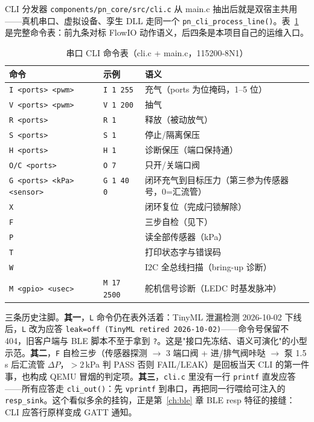CLI 分发器 \texttt{components/pn\_core/src/cli.c} 从 main.c 抽出后就是双宿主共用——真机串口、虚拟设备、孪生 DLL 走同一个 \texttt{pn\_cli\_process\_line()}。表~\ref{tab:fw-cli} 是完整命令表：前九条对标 FlowIO 动作语义，后四条是本项目自己的运维入口。

\begin{table}[htbp]
  \centering
  \caption{串口 CLI 命令表（cli.c + main.c，115200-8N1）}
  \label{tab:fw-cli}
  \begin{tabular}{llp{5.6cm}}
    \toprule
    命令 & 示例 & 语义 \\
    \midrule
    \texttt{I <ports> <pwm>} & \texttt{I 1 255} & 充气（ports 为位掩码，1--5 位） \\
    \texttt{V <ports> <pwm>} & \texttt{V 1 200} & 抽气 \\
    \texttt{R <ports>} & \texttt{R 1} & 释放（被动放气） \\
    \texttt{S <ports>} & \texttt{S 1} & 停止/隔离保压 \\
    \texttt{H <ports>} & \texttt{H 1} & 诊断保压（端口保持通） \\
    \texttt{O/C <ports>} & \texttt{O 7} & 只开/关端口阀 \\
    \texttt{G <ports> <kPa> <sensor>} & \texttt{G 1 40 0} & 闭环充气到目标压力（第三参为传感器号，0=汇流管） \\
    \texttt{X} & & 闭环复位（完成闩锁解除） \\
    \texttt{F} & & 三步自检（见下） \\
    \texttt{P} & & 读全部传感器（kPa） \\
    \texttt{T} & & 打印状态字与错误码 \\
    \texttt{W} & & I2C 全总线扫描（bring-up 诊断） \\
    \texttt{M <gpio> <usec>} & \texttt{M 17 2500} & 舵机信号诊断（LEDC 时基发脉冲） \\
    \bottomrule
  \end{tabular}
\end{table}

三条历史注脚。\textbf{其一}，\texttt{L} 命令仍在表外活着：TinyML 泄漏检测 2026-10-02 下线后，\texttt{L} 改为应答 \texttt{leak=off (TinyML retired 2026-10-02)}——命令号保留不 404，旧客户端与 BLE 脚本不至于拿到 \texttt{?}。这是"接口先冻结、语义可演化"的小型示范。\textbf{其二}，\texttt{F} 自检三步（传感器探测 $\to$ 3 端口阀 + 进/排气阀咔哒 $\to$ 泵 1.5\,s 后汇流管 $\Delta P$，$>2$\,kPa 判 PASS 否则 FAIL/LEAK）是回板当天 CLI 的第一件事，也构成 QEMU 冒烟的判定项。\textbf{其三}，\texttt{cli.c} 里没有一行 \texttt{printf} 直发应答——所有应答走 \texttt{cli\_out()}：先 \texttt{vprintf} 到串口，再把同一行喂给可注入的 \texttt{resp\_sink}。这个看似多余的挂钩，正是第~\ref{ch:ble} 章 BLE resp 特征的接缝：CLI 应答行原样变成 GATT 通知。

